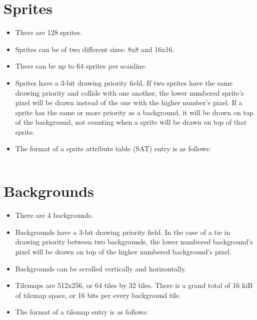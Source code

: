 \documentclass{article}
\begin{document}
\section{Sprites}
	\begin{itemize}
	\item There are 128 sprites.

	\item Sprites can be of two different sizes:  8x8 and 16x16.

	\item There can be up to 64 sprites per scanline.

	\item Sprites have a 3-bit drawing priority field.  If two sprites have
	the same drawing priority and collide with one another, the lower
	numbered sprite's pixel will be drawn instead of the one with the higher
	number's pixel.  If a sprite has the same or more priority as a
	background, it will be drawn on top of the background, not counting
	when a sprite will be drawn on top of that sprite.

	\item The format of a sprite attribute table (SAT) entry is as follows:
		\begin{table}[H]
			\begin{center}
				\begin{tabular}{c|c}
				\end{tabular}
			\end{center}
		\end{table}
	\end{itemize}

\section{Backgrounds}
	\begin{itemize}
	\item There are 4 backgrounds.

	\item Backgrounds have a 3-bit drawing priority field.  In the case of
	a tie in drawing priority between two backgrounds, the lower numbered
	background's pixel will be drawn on top of the higher numbered
	background's pixel.

	\item Backgrounds can be scrolled vertically and horizontally.

	\item Tilemaps are 512x256, or 64 tiles by 32 tiles.  There is a grand
	total of 16 kiB of tilemap space, or 16 bits per every background tile.

	\item The format of a tilemap entry is as follows:
		\begin{table}[H]
			\begin{center}
				\begin{tabular}{c|c}
				\end{tabular}
			\end{center}
		\end{table}
	\end{itemize}



\end{document}
